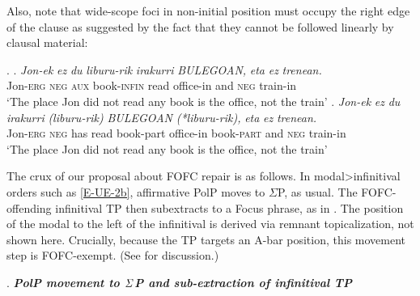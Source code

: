 \documentclass[output=paper]{langscibook}
\begin{document}
	
Also, note that wide-scope foci in non-initial position must occupy the right edge of the clause as suggested by the fact that they cannot be followed linearly by clausal material:


\ex.
\ag. \textit{Jon-ek} \textit{ez} \textit{du} \textit{liburu-rik} \textit{irakurri} \textit{BULEGOAN,} \textit{eta} \textit{ez} \textit{trenean.}\\
Jon-\textsc{erg} \textsc{neg} \textsc{aux} book-\textsc{infin} read office-in and \textsc{neg} train-in\\
`The place Jon did not read any book is the office, not the train'
\bg. \textit{Jon-ek} \textit{ez} \textit{du} \textit{irakurri} \textit{(liburu-rik)} \textit{BULEGOAN} \textit{(*liburu-rik),} \textit{eta} \textit{ez} \textit{trenean.}\\
Jon-\textsc{erg} \textsc{neg} has read book-part office-in book-\textsc{part} and \textsc{neg} train-in\\
`The place Jon did not read any book is the office, not the train'	
	
	
	The crux of our proposal about FOFC repair is as follows.  In modal>infinitival orders such as \protect\ref{E-UE-2b}, affirmative PolP moves to \begin{math}\Sigma \end{math}P, as usual. The FOFC-offending infinitival TP then subextracts to a Focus phrase, as in \Next. The position of the modal to the left of the infinitival is derived via remnant topicalization, not shown here. Crucially, because the TP targets an A-bar position, this movement step is FOFC-exempt. (See \cite{biberaueretal2014} for discussion.)

\ex. \textbf{\textit{PolP movement to \begin{math} \bf{\it{\Sigma}}\end{math}P and sub-extraction of infinitival TP}} \\
\end{document}
